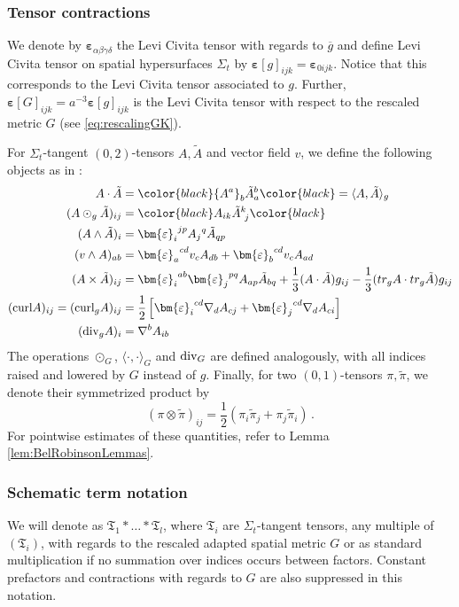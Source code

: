 \documentclass[11pt,leqno,textwidth=10cm]{amsart}
\numberwithin{equation}{section}
\theoremstyle{definition}
\theoremstyle{plain}
\newcommand{\1}{\mathbbm{1}}
\newcommand{\g}{\overline{g}}
\renewcommand{\epsilon}{\varepsilon}
\renewcommand{\div}{\text{\normalfont{div}}}
\newcommand{\curl}{\text{\normalfont{curl}}}
\newcommand{\epsilonLC}{\bm{\epsilon}}
\newcommand{\change}[1]{\color{black}#1\color{black}}
\begin{document}
\subsubsection{Tensor contractions}\label{subsubsec:notation-contract}

We denote by $\epsilonLC_{\alpha\beta\gamma\delta}$ the Levi Civita tensor with regards to $\g$ and define Levi Civita tensor on spatial hypersurfaces $\Sigma_t$ by $\epsilonLC[g]_{ijk}=\epsilonLC_{0ijk}$. Notice that this corresponds to the Levi Civita tensor associated to $g$. Further, $\epsilonLC[G]_{ijk}=a^{-3}\epsilonLC[g]_{ijk}$ is the Levi Civita tensor with respect to the rescaled metric $G$ (see \eqref{eq:rescalingGK}).

For $\Sigma_t$-tangent $(0,2)$-tensors $A,\tilde{A}$ and vector field $v$, we define the following objects \change{as in \cite[Section A.2]{AM03}}:
\begin{align*}
A\cdot\tilde{A}&=\change{{A^a}_b{\tilde{A}_a}^b}=\langle A,\tilde{A}\rangle_g\\
(A\odot_g\tilde{A})_{ij}&=\change{A_{ik}{\tilde{A}^k}_{\ j}}\\
(A\wedge \tilde{A})_i&={\epsilonLC_i}^{jp}{A_j}^q\tilde{A}_{qp}\\
(v\wedge A)_{ab}&={\epsilonLC_a}^{cd}v_cA_{db}+{\epsilonLC_b}^{cd}v_cA_{ad}\\
(A\times \tilde{A})_{ij}&={\epsilonLC_{i}}^{ab}{\epsilonLC_j}^{pq}A_{ap}\tilde{A}_{bq}+\frac13(A\cdot\tilde{A})g_{ij}-\frac13(tr_gA\cdot tr_g\tilde{A})g_{ij}\\
(\curl A)_{ij}=(\curl_g A)_{ij}&=\frac12\left[{\epsilonLC_i}^{cd}\nabla_dA_{cj}+{\epsilonLC_j}^{cd}\nabla_dA_{ci}\right]\\
(\div_g A)_i&=\nabla^bA_{ib}
\end{align*}
The operations $\odot_G$, $\langle\cdot,\cdot\rangle_G$ and $\div_G$ are defined analogously, with all indices raised and lowered by $G$ instead of $g$. Finally, for two $(0,1)$-tensors $\pi,\tilde{\pi}$, we denote their symmetrized product by 
\[(\pi\otimes\tilde{\pi})_{ij}=\frac12\left(\pi_i\tilde{\pi}_j+\pi_j\tilde{\pi}_i\right)\,.\]
\change{For pointwise estimates of these quantities, refer to Lemma \ref{lem:BelRobinsonLemmas}.}

\subsubsection{Schematic term notation}\label{subsubsec:schematic-notation}
We will denote as $\mathfrak{T}_1\ast\dots\ast\mathfrak{T}_l$, \change{where $\mathfrak{T}_i$ }are $\Sigma_t$-tangent tensors, any multiple of $(\mathfrak{T}_i)$, with regards to the rescaled adapted spatial metric $G$ or as standard multiplication if no summation over indices occurs between factors. Constant prefactors and contractions with regards to $G$ are also \change{suppressed }in this notation. 
\end{document}
